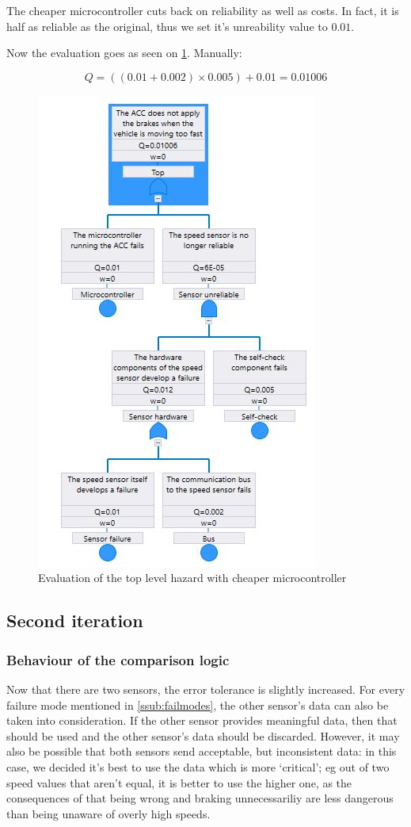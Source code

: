 \documentclass[a4paper]{article}
\begin{document}
The cheaper microcontroller cuts back on reliability as well as costs. In fact,
it is half as reliable as the original, thus we set it's unreability value to
\(0.01\).

Now the evaluation goes as seen on \cref{fig:eval_cheap}. Manually:

\[ Q = \left((0.01 + 0.002) \times 0.005\right) + 0.01 = 0.01006 \]

\begin{figure}
	\centering
	\includegraphics[width=.47\textwidth]{eval_cheap.jpg}
	\caption{Evaluation of the top level hazard with cheaper
	         microcontroller}%
	\label{fig:eval_cheap}
\end{figure}


\subsection{Second iteration}

\subsubsection{Behaviour of the comparison logic}

Now that there are two sensors, the error tolerance is slightly increased. For
every failure mode mentioned in \cref{ssub:failmodes}, the other sensor's data
can also be taken into consideration. If the other sensor provides meaningful
data, then that should be used and the other sensor's data should be discarded.
However, it may also be possible that both sensors send acceptable, but
inconsistent data: in this case, we decided it's best to use the data which is
more ‘critical’; eg out of two speed values that aren't equal, it is better to
use the higher one, as the consequences of that being wrong and braking
unnecessariliy are less dangerous than being unaware of overly high speeds.
\end{document}
